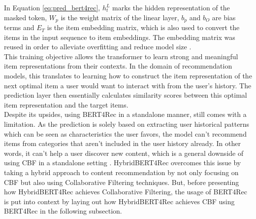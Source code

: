 \documentclass{Academic}
\begin{document}
        In Equation \ref{eq:pred_bert4rec}, $h_t^L$ marks the hidden representation of the masked token, $W_p$ is the weight matrix of the linear layer, $b_p$ and $b_O$ are bias terms and $E_T$ is the item embedding matrix, which is also used to convert the items in the input sequence to item embeddings. The embedding matrix was reused in order to alleviate overfitting and reduce model size \cite{sunBERT4RecSequentialRecommendation2019}. \\
        This training objective allows the transformer to learn strong and meaningful item representations from their contexts. In the domain of recommendation models, this translates to learning how to construct the item representation of the next optimal item a user would want to interact with from the user's history. The prediction layer then essentially calculates similarity scores between this optimal item representation and the target items.\\
        Despite its upsides, using BERT4Rec in a standalone manner, still comes with a limitation. As the prediction is solely based on extracting user historical patterns which can be seen as characteristics the user favors, the model can't recommend items from categories that aren't included in the user history already. In other words, it can't help a user discover new content, which is a general downside of using CBF in a standalone setting \cite{channarongHybridBERT4RecHybridContentBased2022}. HybridBERT4Rec overcomes this issue by taking a hybrid approach to content recommendation by not only focusing on CBF but also using Collaborative Filtering techniques. But, before presenting how HybridBERT4Rec achieves Collaborative Filtering, the usage of BERT4Rec is put into context by laying out how HybridBERT4Rec achieves CBF using BERT4Rec in the following subsection.
\end{document}
